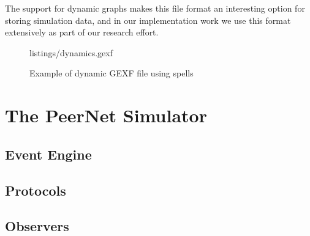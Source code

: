 The
support for dynamic graphs makes this file format an interesting option
for storing simulation data, and in our implementation work we use this
format extensively as part of our research effort.

\begin{figure}
 {listings/dynamics.gexf}
\caption{Example of  dynamic GEXF file using spells}
\end{figure}

\section{The PeerNet Simulator}

\subsection{Event Engine}

\subsection{Protocols}

\subsection{Observers}

